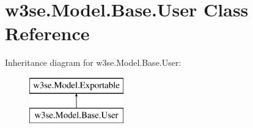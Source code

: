 \hypertarget{classw3se_1_1_model_1_1_base_1_1_user}{\section{w3se.\-Model.\-Base.\-User Class Reference}
\label{classw3se_1_1_model_1_1_base_1_1_user}
}
Inheritance diagram for w3se.\-Model.\-Base.\-User\-:\begin{figure}[H]
\begin{center}
\leavevmode
\includegraphics[height=2.000000cm]{classw3se_1_1_model_1_1_base_1_1_user}
\end{center}
\end{figure}
